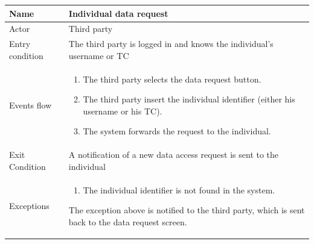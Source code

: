\begin{table}[p]
\centering
\begin{tabular}{|l|p{11cm}|}
    \hline
    Name & Individual data request
    \\ \hline
    Actor & Third party
    \\ \hline 
    Entry condition & The third party is logged in and knows the individual's username or TC
        \\ \hline
    Events flow &
    \begin{enumerate}
    \item The third party selects the data request button.
	\item The third party insert the individual identifier (either his username or his TC).
	\item The system forwards the request to the individual.
    \end{enumerate}
     \\ \hline
     Exit Condition & A notification of a new data access request is sent to the individual
     \\
    \hline
    Exceptions &
        \begin{enumerate}
    \item The individual identifier is not found in the system.
    \end{enumerate}
     The exception above is notified to the third party, which is sent back to the data request screen.
        \\  \hline

\end{tabular}
\end{table}


